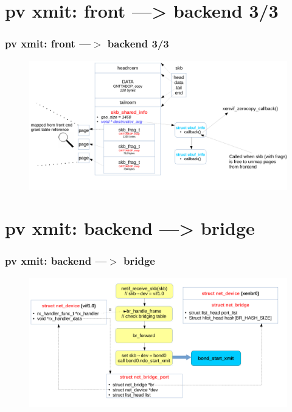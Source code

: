 \documentclass[aspectratio=169]{beamer}
\begin{document}

\section{pv xmit: front ---> backend 3/3}
\begin{frame}
\frametitle{pv xmit: front ---$>$ backend 3/3}
\begin{figure}
\includegraphics[width=1.0\linewidth]{figures/skb_destruct.pdf}
\end{figure}
\end{frame}



\section{pv xmit: backend ---> bridge}
\begin{frame}
\frametitle{pv xmit: backend ---$>$ bridge}
\begin{figure}
\includegraphics[width=1.0\linewidth]{figures/vif_to_bridge.pdf}
\end{figure}
\end{frame}
\end{document}
